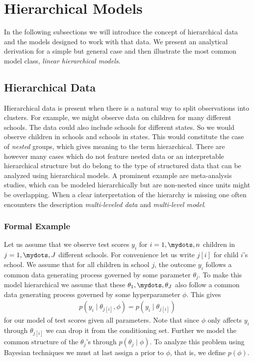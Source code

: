 \section{Hierarchical Models}
In the following subsections we will introduce the concept of hierarchical data
and the models designed to work with that data. We present an analytical
derivation for a simple but general case and then illustrate the most common
model class, \emph{linear hierarchical models}.

\subsection{Hierarchical Data}
Hierarchical data is present when there is a natural way to split observations
into clusters. For example, we might observe data on children for many different
schools. The data could also include schools for different states. So we would
observe children in schools and schools in states. This would
constitute the case of \emph{nested} groups, which gives meaning to the term
hierarchical. There are however many cases which do not feature nested data
or an interpretable hierarchical structure but do belong to the type of structured
data that can be analyzed using hierarchical models. A prominent example are
meta-analysis studies, which can be modeled hierarchically but are non-nested
since units might be overlapping. When a clear interpretation of the hierarchy is missing
one often encounters the description \emph{multi-leveled data} and \emph{multi-level model}.

\subsubsection*{Formal Example}
Let us assume that we observe test scores $y_i$ for $i = 1,\mydots,n$ children
in $j=1,\mydots,J$ different schools. For convenience let us write $j[i]$ for child
$i$'s school. We assume that for all children in school $j$, the outcome $y_i$
follows a common data generating process governed by some parameter $\theta_j$.
To make this model hierarchical we assume that these $\theta_1,\mydots,\theta_J$
also follow a common data generating process governed by some hyperparameter $\phi$.
This gives
\begin{align}
  p(y_i \mid \theta_{j[i]}, \phi) = p(y_i \mid \theta_{j[i]})
\end{align}
for our model of test scores given all parameters. Note that since $\phi$ only
affects $y_i$ through $\theta_{j[i]}$ we can drop it from the conditioning set.
Further we model the common structure of the $\theta_j$'s through $p(\theta_j \mid \phi)$.
To analyze this problem using Bayesian techniques we must at last assign a prior
to $\phi$, that is, we define $p(\phi)$.

